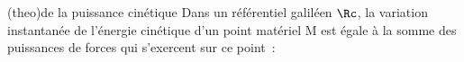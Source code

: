 \documentclass[../../main/main.tex]{subfiles}
\begin{document}

\begin{tcb*}(theo){de la puissance cinétique}
	Dans un référentiel galiléen $\Rc$, la variation instantanée de l'énergie
	cinétique d'un point matériel M est égale à la somme des puissances de
	forces qui s'exercent sur ce point~:
	\psw{
		\[\boxed{\dv{\Ec_c\MRg}{t} = \sum_i \Pc\Rg(\Ff_i)}\]
	}
	\vspace{-15pt}
\end{tcb*}
\end{document}
